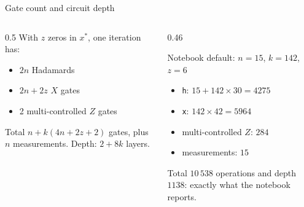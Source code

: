 \documentclass[aspectratio=169,11pt]{beamer}
\newcommand{\xs}{x^\ast}
\begin{document}
\begin{frame}{Gate count and circuit depth}
  \begin{columns}[T]
    \begin{column}{0.5\textwidth}
      With $z$ zeros in $\xs$, one iteration has:
      \begin{itemize}
        \item $2n$ Hadamards
        \item $2n + 2z$ $X$ gates
        \item 2 multi-controlled $Z$ gates
      \end{itemize}
      \begin{block}{Total}
        $n + k(4n + 2z + 2)$ gates, plus $n$ measurements. Depth: $2 + 8k$ layers.
      \end{block}
    \end{column}
    \begin{column}{0.46\textwidth}
      \begin{exampleblock}{Notebook default: $n = 15$, $k = 142$, $z = 6$}
        \begin{itemize}
          \item \texttt{h}: $15 + 142\times30 = 4275$
          \item \texttt{x}: $142\times42 = 5964$
          \item multi-controlled $Z$: $284$
          \item measurements: $15$
        \end{itemize}
        Total $10\,538$ operations and depth $1138$: exactly what the notebook reports.
      \end{exampleblock}
    \end{column}
  \end{columns}
\end{frame}
\end{document}
